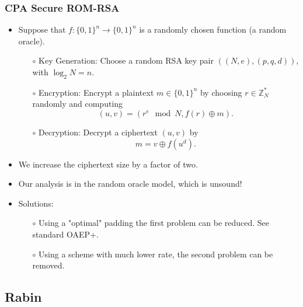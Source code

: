 \documentclass[a4paper]{scrartcl}
\begin{document}
\subsubsection*{CPA Secure ROM-RSA}

\begin{itemize}
\item Suppose that $f : \{0,1\}^n \rightarrow \{0,1\}^n$ is a randomly chosen function (a random oracle).
\begin{itemize}
\item [$\circ$] Key Generation: Choose a random RSA key pair $((N,e), (p,q,d))$, with $\log_2 N = n$.
\item [$\circ$] Encryption: Encrypt a plaintext $m \in \{0,1\}^n$ by choosing $r\in \mathbb{Z}_N^*$ randomly and computing $$(u,v) = (r^e \mod N, f(r) \oplus m).$$
\item [$\circ$] Decryption: Decrypt a ciphertext $(u,v)$ by $$m = v \oplus f(u^d).$$
\end{itemize}
\item We increase the ciphertext size by a factor of two.
\item Our analysis is in the random oracle model, which is unsound!
\item Solutions: 
\begin{itemize}
\item [$\circ$] Using a "optimal" padding the first problem can be reduced. See standard OAEP+.
\item [$\circ$] Using a scheme with much lower rate, the second problem can be removed.
\end{itemize}
\end{itemize}

\subsection*{Rabin}
\end{document}
